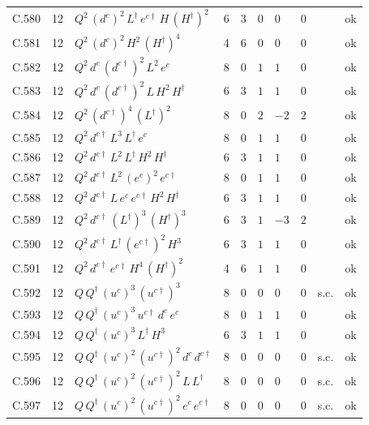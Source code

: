 {\begin{longtable}{@{}ll>{\raggedright\arraybackslash}p{6.4cm}rrllllr@{}}
C.580 & 12 & $Q^{2}\,(d^c)^{2}\,L^\dagger\,e^{c\dagger}\,H\,(H^\dagger)^{2}$ & 6 & 3 & $0$ & $0$ & $0$ &  & ok \\
C.581 & 12 & $Q^{2}\,(d^c)^{2}\,H^{2}\,(H^\dagger)^{4}$ & 4 & 6 & $0$ & $0$ & $0$ &  & ok \\
C.582 & 12 & $Q^{2}\,d^c\,(d^{c\dagger})^{2}\,L^{2}\,e^c$ & 8 & 0 & $1$ & $1$ & $0$ &  & ok \\
C.583 & 12 & $Q^{2}\,d^c\,(d^{c\dagger})^{2}\,L\,H^{2}\,H^\dagger$ & 6 & 3 & $1$ & $1$ & $0$ &  & ok \\
C.584 & 12 & $Q^{2}\,(d^{c\dagger})^{4}\,(L^\dagger)^{2}$ & 8 & 0 & $2$ & $-2$ & $2$ &  & ok \\
C.585 & 12 & $Q^{2}\,d^{c\dagger}\,L^{3}\,L^\dagger\,e^c$ & 8 & 0 & $1$ & $1$ & $0$ &  & ok \\
C.586 & 12 & $Q^{2}\,d^{c\dagger}\,L^{2}\,L^\dagger\,H^{2}\,H^\dagger$ & 6 & 3 & $1$ & $1$ & $0$ &  & ok \\
C.587 & 12 & $Q^{2}\,d^{c\dagger}\,L^{2}\,(e^c)^{2}\,e^{c\dagger}$ & 8 & 0 & $1$ & $1$ & $0$ &  & ok \\
C.588 & 12 & $Q^{2}\,d^{c\dagger}\,L\,e^c\,e^{c\dagger}\,H^{2}\,H^\dagger$ & 6 & 3 & $1$ & $1$ & $0$ &  & ok \\
C.589 & 12 & $Q^{2}\,d^{c\dagger}\,(L^\dagger)^{3}\,(H^\dagger)^{3}$ & 6 & 3 & $1$ & $-3$ & $2$ &  & ok \\
C.590 & 12 & $Q^{2}\,d^{c\dagger}\,L^\dagger\,(e^{c\dagger})^{2}\,H^{3}$ & 6 & 3 & $1$ & $1$ & $0$ &  & ok \\
C.591 & 12 & $Q^{2}\,d^{c\dagger}\,e^{c\dagger}\,H^{4}\,(H^\dagger)^{2}$ & 4 & 6 & $1$ & $1$ & $0$ &  & ok \\
C.592 & 12 & $Q\,Q^\dagger\,(u^c)^{3}\,(u^{c\dagger})^{3}$ & 8 & 0 & $0$ & $0$ & $0$ & s.c. & ok \\
C.593 & 12 & $Q\,Q^\dagger\,(u^c)^{3}\,u^{c\dagger}\,d^c\,e^c$ & 8 & 0 & $1$ & $1$ & $0$ &  & ok \\
C.594 & 12 & $Q\,Q^\dagger\,(u^c)^{3}\,L^\dagger\,H^{3}$ & 6 & 3 & $1$ & $1$ & $0$ &  & ok \\
C.595 & 12 & $Q\,Q^\dagger\,(u^c)^{2}\,(u^{c\dagger})^{2}\,d^c\,d^{c\dagger}$ & 8 & 0 & $0$ & $0$ & $0$ & s.c. & ok \\
C.596 & 12 & $Q\,Q^\dagger\,(u^c)^{2}\,(u^{c\dagger})^{2}\,L\,L^\dagger$ & 8 & 0 & $0$ & $0$ & $0$ & s.c. & ok \\
C.597 & 12 & $Q\,Q^\dagger\,(u^c)^{2}\,(u^{c\dagger})^{2}\,e^c\,e^{c\dagger}$ & 8 & 0 & $0$ & $0$ & $0$ & s.c. & ok \\

\end{longtable}}

